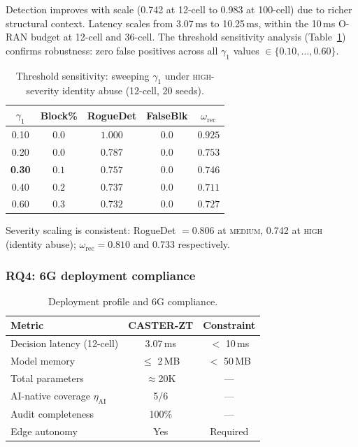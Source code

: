 Detection improves with scale (0.742 at 12-cell to 0.983 at 100-cell) due to richer structural context.
Latency scales from 3.07\,ms to 10.25\,ms, within the 10\,ms O-RAN budget at 12-cell and 36-cell.
The threshold sensitivity analysis (Table~\ref{art3:tab:threshold_sensitivity}) confirms robustness: zero false positives across all $\gamma_1$ values $\in\{0.10,\ldots,0.60\}$.

\begin{table}[t]
\centering
\caption{Threshold sensitivity: sweeping $\gamma_1$ under \textsc{high}-severity identity abuse (12-cell, 20 seeds).}
\label{art3:tab:threshold_sensitivity}
\begin{tabular}{ccccc}
\toprule
$\gamma_1$ & Block\% & RogueDet & FalseBlk & $\omega_{\mathrm{rec}}$ \\
\midrule
0.10 & $0.0$ & $1.000$ & $0.0$ & $0.925$ \\
0.20 & $0.0$ & $0.787$ & $0.0$ & $0.753$ \\
\textbf{0.30} & $\mathbf{0.1}$ & $\mathbf{0.757}$ & $\mathbf{0.0}$ & $\mathbf{0.746}$ \\
0.40 & $0.2$ & $0.737$ & $0.0$ & $0.711$ \\
0.60 & $0.3$ & $0.732$ & $0.0$ & $0.727$ \\
\bottomrule
\end{tabular}
\end{table}

Severity scaling is consistent: RogueDet $=0.806$ at \textsc{medium}, 0.742 at \textsc{high} (identity abuse); $\omega_{\mathrm{rec}}=0.810$ and 0.733 respectively.


\subsubsection{RQ4: 6G deployment compliance}

\begin{table}[t]
\centering
\caption{Deployment profile and 6G compliance.}
\label{art3:tab:deployment}
\begin{tabular}{lcc}
\toprule
Metric & CASTER-ZT & Constraint \\
\midrule
Decision latency (12-cell) & 3.07\,ms & $<$ 10\,ms \\
Model memory & $\le$ 2\,MB & $<$ 50\,MB \\
Total parameters & $\approx$20K & --- \\
AI-native coverage $\eta_{\mathrm{AI}}$ & 5/6 & --- \\
Audit completeness & 100\% & --- \\
Edge autonomy & Yes & Required \\
\bottomrule
\end{tabular}
\end{table}

